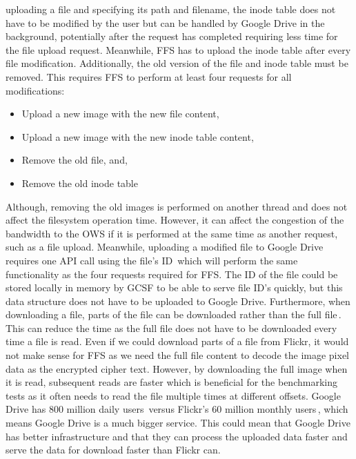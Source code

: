 uploading a file and specifying its path and filename, the inode table does not have to be modified by the user but can be handled by Google Drive in the background, potentially after the request has completed requiring less time for the file upload request. Meanwhile, \gls{FFS} has to upload the inode table after every file modification. Additionally, the old version of the file and inode table must be removed. This requires \gls{FFS} to perform at least four requests for all modifications:
\begin{itemize}
	\item Upload a new image with the new file content,
	\item Upload a new image with the new inode table content,
	\item Remove the old file, and,
	\item Remove the old inode table
\end{itemize}
Although, removing the old images is performed on another thread and does not affect the filesystem operation time. However, it can affect the congestion of the bandwidth to the \gls{OWS} if it is performed at the same time as another request, such as a file upload. Meanwhile, uploading a modified file to Google Drive requires one \gls{API} call using the file's ID\,\cite{FilesUpdateDrive2022} which will perform the same functionality as the four requests required for \gls{FFS}. The ID of the file could be stored locally in memory by \gls{GCSF} to be able to serve file ID's quickly, but this data structure does not have to be uploaded to Google Drive. Furthermore, when downloading a file, parts of the file can be downloaded rather than the full file\,\cite{googleDownloadFilesDrive2022}. This can reduce the time as the full file does not have to be downloaded every time a file is read. Even if we could download parts of a file from Flickr, it would not make sense for \gls{FFS} as we need the full file content to decode the image pixel data as the encrypted cipher text. However, by downloading the full image when it is read, subsequent reads are faster which is beneficial for the benchmarking tests as it often needs to read the file multiple times at different offsets. Google Drive has 800 million daily users\,\cite{lardinoisGoogleUpdatesDrive2017} versus Flickr's 60 million monthly users\,\cite{campbellFlickrStatistics20222022}, which means Google Drive is a much bigger service. This could mean that Google Drive has better infrastructure and that they can process the uploaded data faster and serve the data for download faster than Flickr can.


